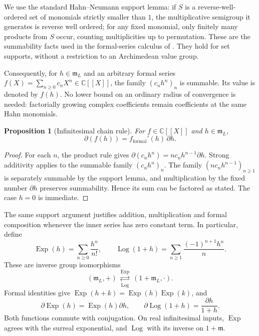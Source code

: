 \documentclass[11pt]{article}
\numberwithin{equation}{section}
\newtheorem{proposition}[theorem]{Proposition}
\theoremstyle{definition}
\newcommand{\C}{\mathbb C}
\newcommand{\mm}{\mathfrak m}
\newcommand{\DD}{\partial}
\newcommand{\Exp}{\operatorname{Exp}}
\newcommand{\Log}{\operatorname{Log}}
\begin{document}
We use the standard Hahn--Neumann support lemma: if $S$ is a
reverse-well-ordered set of monomials strictly smaller than $1$, the
multiplicative semigroup it generates is reverse well ordered; for any
fixed monomial, only finitely many products from $S$ occur, counting
multiplicities up to permutation. These are the summability facts used in
the formal-series calculus of \cite[\S3.2]{BMgerms}. They hold for set supports,
without a restriction to an Archimedean value group.

Consequently, for $h\in\mm_L$ and an arbitrary formal series
$f(X)=\sum_{n\ge0}c_nX^n\in\C[[X]]$, the family $(c_nh^n)_n$ is
summable. Its value is denoted by $f(h)$. No lower bound on an ordinary
radius of convergence is needed: factorially growing complex coefficients
remain coefficients at the same Hahn monomials.

\begin{proposition}[Infinitesimal chain rule]\label{prop:formalchain}
For $f\in\C[[X]]$ and $h\in\mm_L$,
\begin{equation}\label{eq:formalchain}
 \DD(f(h))=f_{\mathrm{formal}}'(h)\,\DD h.
\end{equation}
\end{proposition}
\begin{proof}
For each $n$, the product rule gives
$\DD(c_nh^n)=nc_nh^{n-1}\DD h$. Strong additivity applies to the
summable family $(c_nh^n)_n$. The family
$(nc_nh^{n-1})_{n\ge1}$ is separately summable by the support lemma,
and multiplication by the fixed number $\DD h$ preserves summability.
Hence its sum can be factored as stated. The case $h=0$ is immediate.
\end{proof}

The same support argument justifies addition, multiplication and formal
composition whenever the inner series has zero constant term. In
particular, define
\begin{equation}\label{eq:smallExpLog}
 \Exp(h)=\sum_{n\ge0}\frac{h^n}{n!},\qquad
 \Log(1+h)=\sum_{n\ge1}\frac{(-1)^{n+1}h^n}{n}.
\end{equation}
These are inverse group isomorphisms
\[
 (\mm_L,+)\ \underset{\Log}{\stackrel{\Exp}{\rightleftarrows}}\
 (1+\mm_L,\cdot).
\]
Formal identities give $\Exp(h+k)=\Exp(h)\Exp(k)$, and
\begin{equation}\label{eq:smallExpLogderivatives}
 \DD\Exp(h)=\Exp(h)\DD h,\qquad
 \DD\Log(1+h)=\frac{\DD h}{1+h}.
\end{equation}
Both functions commute with conjugation. On real infinitesimal inputs,
$\Exp$ agrees with the surreal exponential, and $\Log$ with its inverse
on $1+\mm$.
\end{document}

